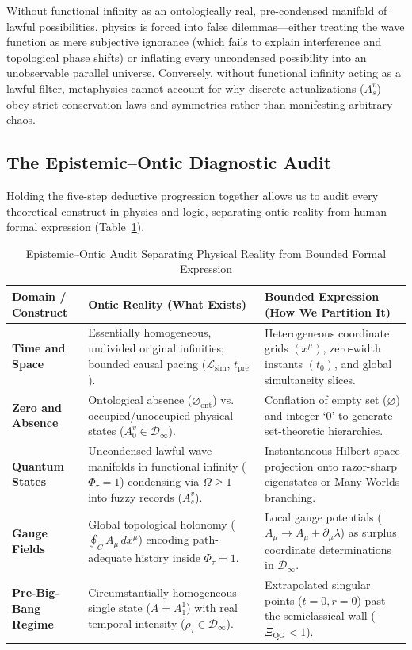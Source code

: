\documentclass[11pt,a4paper]{article}
\begin{document}
Without functional infinity as an ontologically real, pre-condensed manifold of lawful possibilities, physics is forced into false dilemmas—either treating the wave function as mere subjective ignorance (which fails to explain interference and topological phase shifts) or inflating every uncondensed possibility into an unobservable parallel universe. Conversely, without functional infinity acting as a lawful filter, metaphysics cannot account for why discrete actualizations ($A_s^v$) obey strict conservation laws and symmetries rather than manifesting arbitrary chaos.

\subsection{The Epistemic--Ontic Diagnostic Audit}

Holding the five-step deductive progression together allows us to audit every theoretical construct in physics and logic, separating ontic reality from human formal expression (Table~\ref{tab:audit}).

\begin{table}[htbp]
\centering
\caption{Epistemic--Ontic Audit Separating Physical Reality from Bounded Formal Expression}
\label{tab:audit}
\renewcommand{\arraystretch}{1.35}
\begin{tabular}{>{\raggedright\arraybackslash}p{} >{\raggedright\arraybackslash}p{} >{\raggedright\arraybackslash}p{}}
\toprule
\textbf{Domain / Construct} & \textbf{Ontic Reality (What Exists)} & \textbf{Bounded Expression (How We Partition It)} \\
\midrule
\textbf{Time and Space} & Essentially homogeneous, undivided original infinities; bounded causal pacing ($\mathcal{L}_{\mathrm{sim}}$, $t_{\mathrm{pre}}$). & Heterogeneous coordinate grids $(x^\mu)$, zero-width instants $(t_0)$, and global simultaneity slices. \\
\textbf{Zero and Absence} & Ontological absence ($\varnothing_{\mathrm{ont}}$) vs. occupied/unoccupied physical states ($A_0^v \in \mathcal{D}_\infty$). & Conflation of empty set ($\varnothing$) and integer `$0$' to generate set-theoretic hierarchies. \\
\textbf{Quantum States} & Uncondensed lawful wave manifolds in functional infinity ($\Phi_\tau = 1$) condensing via $\Omega \ge 1$ into fuzzy records ($A_s^v$). & Instantaneous Hilbert-space projection onto razor-sharp eigenstates or Many-Worlds branching. \\
\textbf{Gauge Fields} & Global topological holonomy ($\oint_C A_\mu\,dx^\mu$) encoding path-adequate history inside $\Phi_\tau = 1$. & Local gauge potentials ($A_\mu \to A_\mu + \partial_\mu \lambda$) as surplus coordinate determinations in $\mathcal{D}_\infty$. \\
\textbf{Pre-Big-Bang Regime} & Circumstantially homogeneous single state ($A = A_1^1$) with real temporal intensity ($\rho_\tau \in \mathcal{D}_\infty$). & Extrapolated singular points ($t = 0, r = 0$) past the semiclassical wall ($\Xi_{\mathrm{QG}} < 1$). \\
\bottomrule
\end{tabular}
\end{table}
\end{document}
